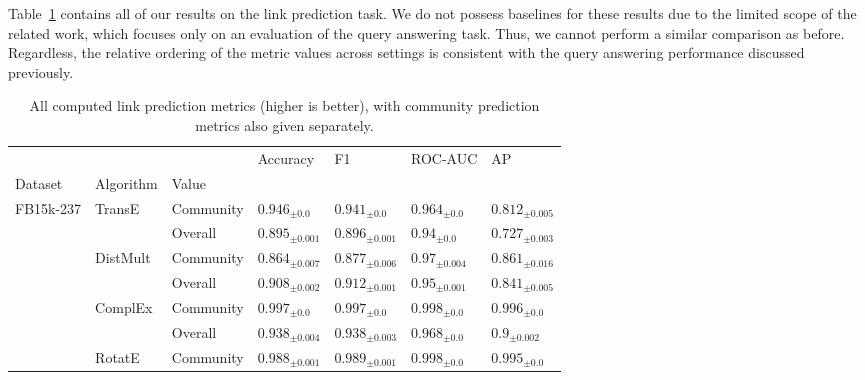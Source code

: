 Table~\ref{tab:performance_link_prediction} contains all of our results on the link prediction task. We do not possess baselines for these results due to the limited scope of the related work, which focuses only on an evaluation of the query answering task. Thus, we cannot perform a similar comparison as before. Regardless, the relative ordering of the metric values across settings is consistent with the query answering performance discussed previously.

\begin{table}[hb!]
  \caption[All computed link prediction metrics.]{All computed link prediction metrics (higher is better), with community prediction metrics also given separately.}
  \label{tab:performance_link_prediction}
  \centering
    \begin{adjustbox}{width=\textwidth}%
\begin{tabular}{lllllll}
\toprule
         &           &         &                 Accuracy &                       F1 &                  ROC-AUC &                       AP \\
Dataset & Algorithm & Value &                          &                          &                          &                          \\
\midrule
FB15k-237 & TransE & Community &    ${{0.946}_{\pm 0.0}}$ &    ${{0.941}_{\pm 0.0}}$ &    ${{0.964}_{\pm 0.0}}$ &  ${{0.812}_{\pm 0.005}}$ \\
         &           & Overall &  ${{0.895}_{\pm 0.001}}$ &  ${{0.896}_{\pm 0.001}}$ &     ${{0.94}_{\pm 0.0}}$ &  ${{0.727}_{\pm 0.003}}$ \\
         & DistMult & Community &  ${{0.864}_{\pm 0.007}}$ &  ${{0.877}_{\pm 0.006}}$ &   ${{0.97}_{\pm 0.004}}$ &  ${{0.861}_{\pm 0.016}}$ \\
         &           & Overall &  ${{0.908}_{\pm 0.002}}$ &  ${{0.912}_{\pm 0.001}}$ &   ${{0.95}_{\pm 0.001}}$ &  ${{0.841}_{\pm 0.005}}$ \\
         & ComplEx & Community &    ${{0.997}_{\pm 0.0}}$ &    ${{0.997}_{\pm 0.0}}$ &    ${{0.998}_{\pm 0.0}}$ &    ${{0.996}_{\pm 0.0}}$ \\
         &           & Overall &  ${{0.938}_{\pm 0.004}}$ &  ${{0.938}_{\pm 0.003}}$ &    ${{0.968}_{\pm 0.0}}$ &    ${{0.9}_{\pm 0.002}}$ \\
         & RotatE & Community &  ${{0.988}_{\pm 0.001}}$ &  ${{0.989}_{\pm 0.001}}$ &    ${{0.998}_{\pm 0.0}}$ &    ${{0.995}_{\pm 0.0}}$ \\

\end{tabular}
\end{adjustbox}
\end{table}
